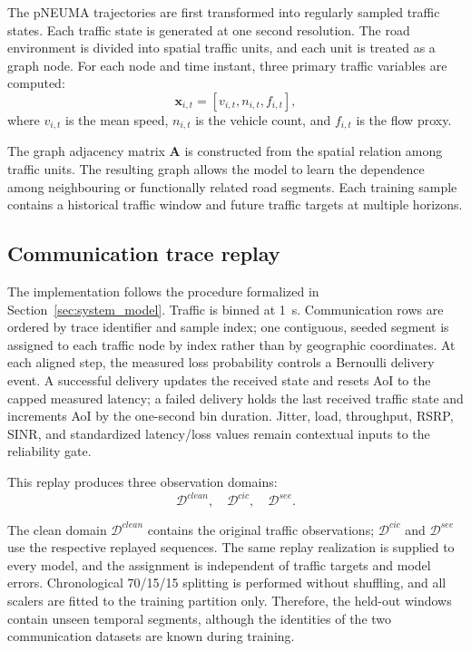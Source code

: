 \documentclass[pdflatex,sn-mathphys-num]{sn-jnl}%
\newenvironment{changed}{\color{blue}}{}
\theoremstyle{thmstyleone}%
\theoremstyle{thmstyletwo}%
\theoremstyle{thmstylethree}%
\begin{document}
The pNEUMA trajectories are first transformed into regularly sampled traffic states. Each traffic state is generated at one second resolution. The road environment is divided into spatial traffic units, and each unit is treated as a graph node. For each node and time instant, three primary traffic variables are computed:
\begin{equation}
    \mathbf{x}_{i,t}
    =
    \left[
    v_{i,t},
    n_{i,t},
    f_{i,t}
    \right],
\end{equation}
where \(v_{i,t}\) is the mean speed, \(n_{i,t}\) is the vehicle count, and \(f_{i,t}\) is the flow proxy.

The graph adjacency matrix \(\mathbf{A}\) is constructed from the spatial relation among traffic units. The resulting graph allows the model to learn the dependence among neighbouring or functionally related road segments. Each training sample contains a historical traffic window and future traffic targets at multiple horizons.

\subsection{Communication trace replay}
\label{subsec:communication_trace_replay}

\begin{changed}
The implementation follows the procedure formalized in Section~\ref{sec:system_model}. Traffic is binned at 1~s. Communication rows are ordered by trace identifier and sample index; one contiguous, seeded segment is assigned to each traffic node by index rather than by geographic coordinates. At each aligned step, the measured loss probability controls a Bernoulli delivery event. A successful delivery updates the received state and resets AoI to the capped measured latency; a failed delivery holds the last received traffic state and increments AoI by the one-second bin duration. Jitter, load, throughput, RSRP, SINR, and standardized latency/loss values remain contextual inputs to the reliability gate.

This replay produces three observation domains:
\begin{equation}
    \mathcal{D}^{clean},
    \quad
    \mathcal{D}^{cic},
    \quad
    \mathcal{D}^{see}.
\end{equation}

The clean domain \(\mathcal{D}^{clean}\) contains the original traffic observations; \(\mathcal{D}^{cic}\) and \(\mathcal{D}^{see}\) use the respective replayed sequences. The same replay realization is supplied to every model, and the assignment is independent of traffic targets and model errors. Chronological 70/15/15 splitting is performed without shuffling, and all scalers are fitted to the training partition only. Therefore, the held-out windows contain unseen temporal segments, although the identities of the two communication datasets are known during training.
\end{changed}
\end{document}
